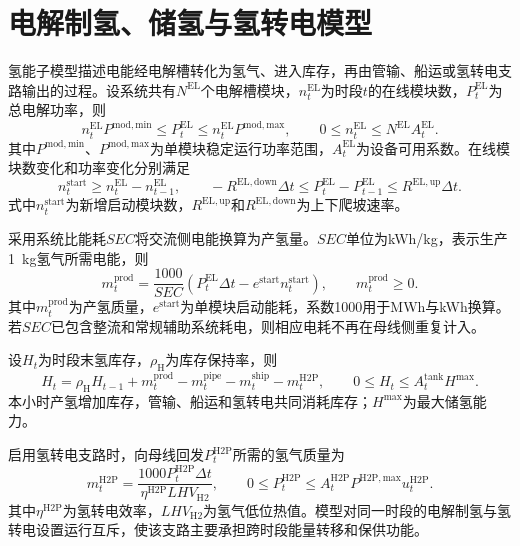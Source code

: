 \section{电解制氢、储氢与氢转电模型}
\label{sec:hydrogen}

氢能子模型描述电能经电解槽转化为氢气、进入库存，再由管输、船运或氢转电支路输出的过程。设系统共有$N^{\mathrm{EL}}$个电解槽模块，$n_t^{\mathrm{EL}}$为时段$t$的在线模块数，$P_t^{\mathrm{EL}}$为总电解功率，则
\begin{equation}
n_t^{\mathrm{EL}}P^{\mathrm{mod,min}}
\le P_t^{\mathrm{EL}}
\le n_t^{\mathrm{EL}}P^{\mathrm{mod,max}},
\qquad
0\le n_t^{\mathrm{EL}}\le N^{\mathrm{EL}}A_t^{\mathrm{EL}}.
\label{eq:ely-module}
\end{equation}
其中$P^{\mathrm{mod,min}}$、$P^{\mathrm{mod,max}}$为单模块稳定运行功率范围，$A_t^{\mathrm{EL}}$为设备可用系数。在线模块数变化和功率变化分别满足
\begin{equation}
n_t^{\mathrm{start}}\ge n_t^{\mathrm{EL}}-n_{t-1}^{\mathrm{EL}},\qquad
-R^{\mathrm{EL,down}}\Delta t
\le P_t^{\mathrm{EL}}-P_{t-1}^{\mathrm{EL}}
\le R^{\mathrm{EL,up}}\Delta t .
\label{eq:ely-ramp}
\end{equation}
式中$n_t^{\mathrm{start}}$为新增启动模块数，$R^{\mathrm{EL,up}}$和$R^{\mathrm{EL,down}}$为上下爬坡速率。

采用系统比能耗$SEC$将交流侧电能换算为产氢量。$SEC$单位为kWh/kg，表示生产1~kg氢气所需电能，则
\begin{equation}
m_t^{\mathrm{prod}}
=\frac{1000}{SEC}
\left(P_t^{\mathrm{EL}}\Delta t-e^{\mathrm{start}}n_t^{\mathrm{start}}\right),
\qquad m_t^{\mathrm{prod}}\ge0 .
\label{eq:h2-production}
\end{equation}
其中$m_t^{\mathrm{prod}}$为产氢质量，$e^{\mathrm{start}}$为单模块启动能耗，系数1000用于MWh与kWh换算。若$SEC$已包含整流和常规辅助系统耗电，则相应电耗不再在母线侧重复计入。

设$H_t$为时段末氢库存，$\rho_{\mathrm H}$为库存保持率，则
\begin{equation}
H_t=\rho_{\mathrm H}H_{t-1}
+m_t^{\mathrm{prod}}
-m_t^{\mathrm{pipe}}
-m_t^{\mathrm{ship}}
-m_t^{\mathrm{H2P}},
\qquad
0\le H_t\le A_t^{\mathrm{tank}}H^{\max}.
\label{eq:h2-inventory}
\end{equation}
本小时产氢增加库存，管输、船运和氢转电共同消耗库存；$H^{\max}$为最大储氢能力。

启用氢转电支路时，向母线回发$P_t^{\mathrm{H2P}}$所需的氢气质量为
\begin{equation}
m_t^{\mathrm{H2P}}
=\frac{1000P_t^{\mathrm{H2P}}\Delta t}
{\eta^{\mathrm{H2P}}LHV_{\mathrm{H2}}},
\qquad
0\le P_t^{\mathrm{H2P}}
\le A_t^{\mathrm{H2P}}P^{\mathrm{H2P,max}}u_t^{\mathrm{H2P}}.
\label{eq:h2-to-power}
\end{equation}
其中$\eta^{\mathrm{H2P}}$为氢转电效率，$LHV_{\mathrm{H2}}$为氢气低位热值。模型对同一时段的电解制氢与氢转电设置运行互斥，使该支路主要承担跨时段能量转移和保供功能。

